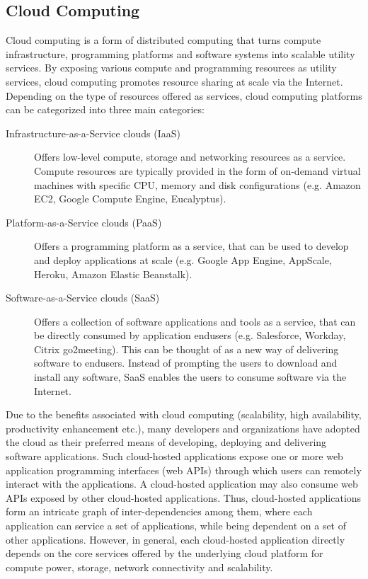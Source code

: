 \subsection{Cloud Computing}

Cloud computing is a form of distributed computing that turns compute infrastructure, programming
platforms and software systems into scalable utility services. By exposing various compute and programming
resources as utility services, cloud computing promotes resource sharing at scale via the Internet.
Depending on the type of resources
offered as services, cloud computing platforms can be categorized into three main categories:

\begin{description}
\item [Infrastructure-as-a-Service clouds (IaaS)]
Offers low-level compute, storage and networking
resources as a service. Compute resources are typically provided in the form of on-demand virtual machines 
with specific CPU, memory and disk configurations (e.g. Amazon EC2, Google Compute Engine, Eucalyptus). 
\item [Platform-as-a-Service clouds (PaaS)]
Offers a programming platform as a service, that can be used to develop and deploy applications at scale 
(e.g. Google App Engine, AppScale, Heroku, Amazon Elastic Beanstalk).
\item [Software-as-a-Service clouds (SaaS)]
Offers a collection of software applications and tools as a service, that can be directly consumed by
application endusers (e.g. Salesforce, Workday, Citrix go2meeting). This can be thought of as a new way 
of delivering software to
endusers. Instead of prompting the users to download and install any software, SaaS enables the users
to consume software via the Internet.  
\end{description}

Due to the benefits associated with cloud computing (scalability, high availability, productivity enhancement etc.),
many developers and organizations have adopted the cloud as their preferred means of developing, deploying and
delivering software applications. Such cloud-hosted applications expose one or more web application programming 
interfaces (web APIs) through which users can remotely interact with the applications. A cloud-hosted 
application may
also consume web APIs exposed by other cloud-hosted applications. Thus, cloud-hosted applications
form an intricate graph of inter-dependencies among them, where each application can service a set of
applications, while being dependent on a set of other applications. However, in general, each cloud-hosted
application directly depends on the core services offered by the underlying cloud platform for compute power, storage,
network connectivity and scalability.

